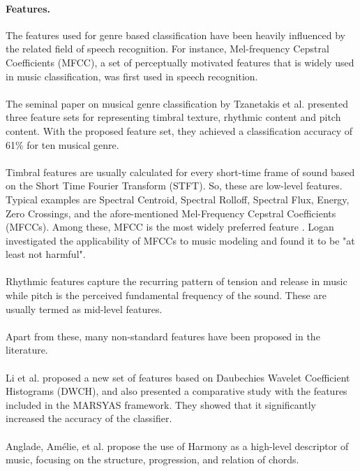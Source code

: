 \paragraph{Features.}
The features used for genre based classification have been heavily influenced by the related field of speech recognition. 
For instance, Mel-frequency Cepstral Coefficients (MFCC), a set of perceptually motivated features that is widely used in music classification, was first used in speech recognition.\\
\\
The seminal paper on musical genre classification by Tzanetakis et al. \cite{Tzanetakis2002} presented three feature sets for representing timbral texture, rhythmic content and pitch content. 
With the proposed feature set, they achieved a classification accuracy of 61\% for ten musical genre.\\
\\
Timbral features are usually calculated for every short-time frame of sound based on the Short Time Fourier Transform (STFT). 
So, these are low-level features. 
Typical examples are Spectral Centroid, Spectral Rolloff, Spectral Flux, Energy, Zero Crossings, and the afore-mentioned Mel-Frequency Cepstral Coefficients (MFCCs).
Among these, MFCC is the most widely preferred feature \cite{Lippens2004}\cite{Kour2015}. Logan \cite{Logan2000} investigated the applicability of MFCCs to music modeling and found it to be "at least not harmful".\\
\\
Rhythmic features capture the recurring pattern of tension and release in music while pitch is the perceived fundamental frequency of the sound. 
These are usually termed as mid-level features.\\
\\
Apart from these, many non-standard features have been proposed in the literature. \\
\\
Li et al.\cite{Li2003} proposed a new set of features based on Daubechies Wavelet Coefficient Histograms (DWCH), and also presented a comparative study with the features included in the MARSYAS framework.
They showed that it significantly increased the accuracy of the classifier.\\
\\
Anglade, Amélie, et al.\cite{Anglade2010} propose the use of Harmony as a high-level descriptor of music, focusing on the structure, progression, and relation of chords.\\
\\


